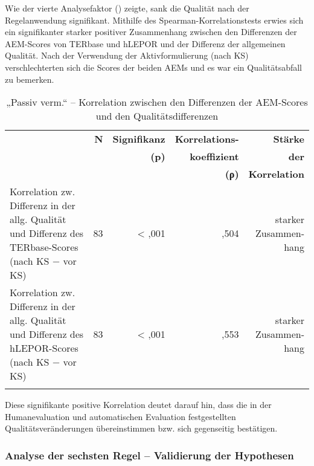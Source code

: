 
Wie der vierte Analysefaktor () zeigte, sank die Qualität nach der Regelanwendung signifikant. Mithilfe des Spearman-Korrelationstests erwies sich ein signifikanter starker positiver Zusammenhang zwischen den Differenzen der AEM-Scores von TERbase und hLEPOR und der Differenz der allgemeinen Qualität. Nach der Verwendung der Aktivformulierung (nach KS) verschlechterten sich die Scores der beiden AEMs und es war ein Qualitätsabfall zu bemerken.


\begin{table}
\begin{tabularx}{\textwidth}{Xrrrr}

\lsptoprule
& \textbf{N} & { \textbf{Signifikanz} } & \textbf{Korrelations-} & \textbf{Stärke}\\
& & \textbf{(p)} & \textbf{koeffizient} & \textbf{der}\\
& & &  \textbf{(ρ)} &  \textbf{Korrelation}\\
\midrule
Korrelation zw. Differenz in der allg. Qualität und Differenz des TERbase-Scores (nach KS $-$ vor KS) & { 83} & < ,001 & ,504 & \makecell[tr]{starker\\Zusammen-\\hang}\\
\tablevspace
Korrelation zw. Differenz in der allg. Qualität und Differenz des hLEPOR-Scores (nach KS $-$ vor KS) & { 83} & < ,001 & ,553 & \makecell[tr]{starker\\Zusammen-\\hang}\\
\lspbottomrule
\end{tabularx}
\caption{\label{tab:05:66}„Passiv verm.“ -- Korrelation zwischen den Differenzen der AEM-Scores und den Qualitätsdifferenzen   }
\end{table}

Diese signifikante positive Korrelation deutet darauf hin, dass die in der Humanevaluation und automatischen Evaluation festgestellten Qualitätsveränderungen übereinstimmen bzw. sich gegenseitig bestätigen.

\subsubsection{\label{sec:5.3.6.7}Analyse der sechsten Regel -- Validierung der Hypothesen}

